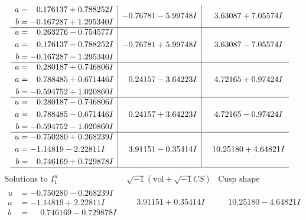 \documentclass[1p]{elsarticle_modified}
\theoremstyle{definition}
\newcommand{\I}{\sqrt{-1}}
\begin{document}
$$\begin{array}{c|c|c}
\begin{aligned}
a &= \phantom{-}0.176137 + 0.788252 I \\
b &= -0.167287 + 1.295340 I\end{aligned}
 & -0.76781 - 5.99748 I & \phantom{-}3.63087 + 7.05574 I \\ \hline\begin{aligned}
u &= \phantom{-}0.263276 - 0.754577 I \\
a &= \phantom{-}0.176137 - 0.788252 I \\
b &= -0.167287 - 1.295340 I\end{aligned}
 & -0.76781 + 5.99748 I & \phantom{-}3.63087 - 7.05574 I \\ \hline\begin{aligned}
u &= \phantom{-}0.280187 + 0.746806 I \\
a &= \phantom{-}0.788485 + 0.671446 I \\
b &= -0.594752 + 1.020860 I\end{aligned}
 & \phantom{-}0.24157 - 3.64223 I & \phantom{-}4.72165 + 0.97424 I \\ \hline\begin{aligned}
u &= \phantom{-}0.280187 - 0.746806 I \\
a &= \phantom{-}0.788485 - 0.671446 I \\
b &= -0.594752 - 1.020860 I\end{aligned}
 & \phantom{-}0.24157 + 3.64223 I & \phantom{-}4.72165 - 0.97424 I \\ \hline\begin{aligned}
u &= -0.750280 + 0.268239 I \\
a &= -1.14819 - 2.22811 I \\
b &= \phantom{-}0.746169 + 0.729878 I\end{aligned}
 & \phantom{-}3.91151 - 0.35414 I & \phantom{-}10.25180 + 4.64821 I\\
 \hline 
 \end{array}$$\newpage$$\begin{array}{c|c|c}  
\text{Solutions to }I^u_{1}& \I (\text{vol} + \sqrt{-1}CS) & \text{Cusp shape}\\
 \hline 
\begin{aligned}
u &= -0.750280 - 0.268239 I \\
a &= -1.14819 + 2.22811 I \\
b &= \phantom{-}0.746169 - 0.729878 I\end{aligned}
 & \phantom{-}3.91151 + 0.35414 I & \phantom{-}10.25180 - 4.64821 I \\ \hline\begin{aligned}

\end{aligned}
\end{array}$$
\end{document}
